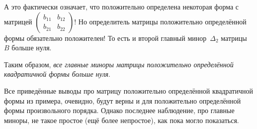 \documentclass[a4paper,12pt]{article}
\begin{document}
\begin{example}
    А это фактически означает, что положительно определена некоторая форма с матрицей $\left(\begin{smallmatrix}
      b_{11} & b_{12}\\
      b_{21} & b_{22}
    \end{smallmatrix}\right)$!
    Но определитель матрицы положительно определённой формы обязательно положителен!
    То есть и второй главный минор~$\Delta_2$ матрицы~$B$ больше нуля.
    
    Таким образом, \emph{все главные миноры матрицы положительно определённой квадратичной формы больше нуля}.
  \end{example}
  
  Все приведённые выводы про матрицу положительно определённой квадратичной формы из примера, очевидно, будут верны и для положительно определённой формы произвольного порядка.
  Однако последнее наблюдение, про главные миноры, не такое простое (ещё более непростое), как пока могло показаться.
  
\end{document}
